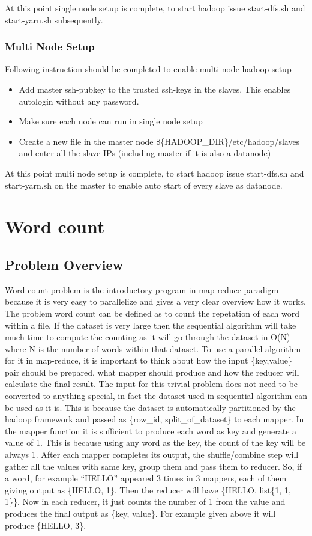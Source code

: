 \documentclass{article}
\begin{document}
At this point single node setup is complete, to start hadoop issue start-dfs.sh and start-yarn.sh subsequently.

\subsubsection{Multi Node Setup}
Following instruction should be completed to enable multi node hadoop setup -
\begin{itemize}
\item Add master ssh-pubkey to the trusted ssh-keys in the slaves. This enables autologin without any password.
\item Make sure each node can run in single node setup
\item Create a new file in the master node  \$\{HADOOP\_DIR\}/etc/hadoop/slaves and enter all the slave IPs (including master if it is also a datanode)
\end{itemize}

At this point multi node setup is complete, to start hadoop issue start-dfs.sh and start-yarn.sh on the master to enable auto start of every slave as datanode.

\section{Word count}
\subsection{Problem Overview}
Word count problem is the introductory program in map-reduce paradigm because it is very easy to parallelize and gives a very clear overview how it works.
\BlankLine The problem word count can be defined as to count the repetation of each word within a file. If the dataset is very large then the sequential algorithm will take much time to compute the counting as it will go through the dataset in O(N) where N is the number of words within that dataset.
\BlankLine
To use a parallel algorithm for it in map-reduce, it is important to think about how the input \{key,value\} pair should be prepared, what mapper should produce and how the reducer will calculate the final result.
\BlankLine
The input for this trivial problem does not need to be converted to anything special, in fact the dataset used in sequential algorithm can be used as it is. This is because the dataset is automatically partitioned by the hadoop framework and passed as \{row\_id, split\_of\_dataset\} to each mapper.
\BlankLine
In the mapper function it is sufficient to produce each word as key and generate a value of 1. This is because using any word as the key, the count of the key will be always 1. 
\BlankLine After each mapper completes its output, the shuffle/combine step will gather all the values with same key, group them and pass them to reducer.
\BlankLine
So, if a word, for example ``HELLO'' appeared 3 times in 3 mappers, each of them giving output as \{HELLO, 1\}. Then the reducer will have \{HELLO, list\{1, 1, 1\}\}. Now in each reducer, it just counts the number of 1 from the value and produces the final output as \{key, value\}. For example given above it will produce \{HELLO, 3\}.
\end{document}
